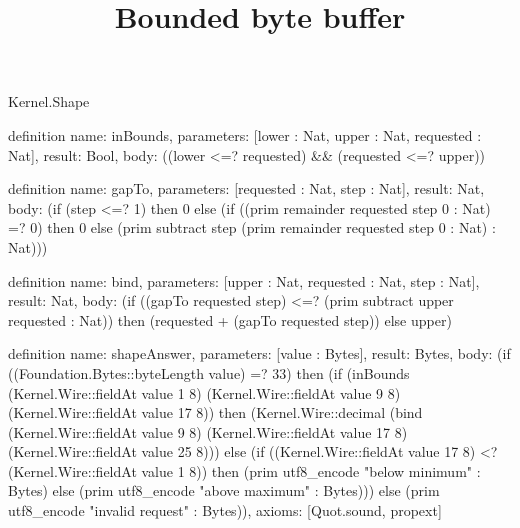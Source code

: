\begin{lexlean}{Kernel.Shape}
\title{Bounded byte buffer}
\begin{semanticmodule}
definition{
  name: inBounds,
  parameters: [lower : Nat, upper : Nat, requested : Nat],
  result: Bool,
  body: ((lower <=? requested) && (requested <=? upper))
}

definition{
  name: gapTo,
  parameters: [requested : Nat, step : Nat],
  result: Nat,
  body: (if (step <=? 1) then 0 else (if ((prim remainder requested step 0 : Nat) =? 0) then 0 else (prim subtract step (prim remainder requested step 0 : Nat) : Nat)))
}

definition{
  name: bind,
  parameters: [upper : Nat, requested : Nat, step : Nat],
  result: Nat,
  body: (if ((gapTo requested step) <=? (prim subtract upper requested : Nat)) then (requested + (gapTo requested step)) else upper)
}

definition{
  name: shapeAnswer,
  parameters: [value : Bytes],
  result: Bytes,
  body: (if ((Foundation.Bytes::byteLength value) =? 33) then (if (inBounds (Kernel.Wire::fieldAt value 1 8) (Kernel.Wire::fieldAt value 9 8) (Kernel.Wire::fieldAt value 17 8)) then (Kernel.Wire::decimal (bind (Kernel.Wire::fieldAt value 9 8) (Kernel.Wire::fieldAt value 17 8) (Kernel.Wire::fieldAt value 25 8))) else (if ((Kernel.Wire::fieldAt value 17 8) <? (Kernel.Wire::fieldAt value 1 8)) then (prim utf8_encode "below minimum" : Bytes) else (prim utf8_encode "above maximum" : Bytes))) else (prim utf8_encode "invalid request" : Bytes)),
  axioms: [Quot.sound, propext]
}
\end{semanticmodule}
\end{lexlean}
